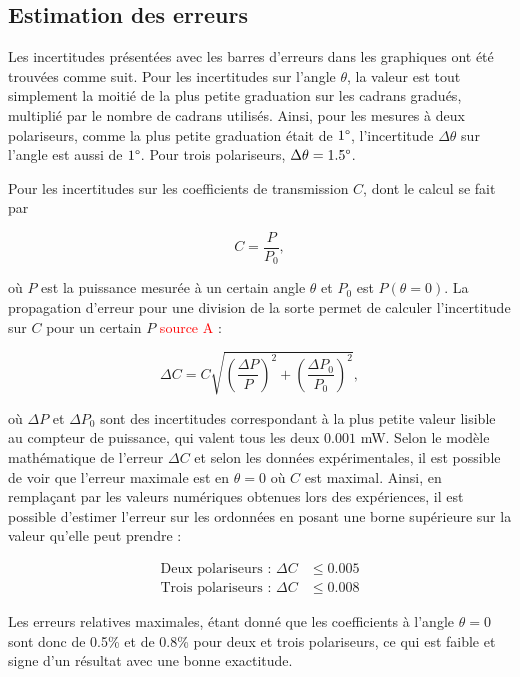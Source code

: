\documentclass[11pt,letterpaper]{article}
\begin{document}
\subsection{Estimation des erreurs}

Les incertitudes présentées avec les barres d'erreurs dans les graphiques ont été trouvées comme suit.
Pour les incertitudes sur l'angle $\theta$, la valeur est tout simplement la moitié de la plus petite
graduation sur les cadrans gradués, multiplié par le nombre de cadrans utilisés. Ainsi, pour les
mesures à deux polariseurs, comme la plus petite graduation était de $1\degree$, l'incertitude 
$\Delta\theta$  sur l'angle est aussi de $1\degree$. Pour trois polariseurs, $\Delta\theta = 1.5\degree$. 

Pour les incertitudes sur les coefficients de transmission $C$, dont le calcul se fait par

\begin{equation}
  C = \frac{P}{P_{0}},
\end{equation}

où $P$ est la puissance mesurée à un certain angle $\theta$ et $P_{0}$ est $P\left( \theta= 0 \right)$.
La propagation d'erreur pour une division de la sorte permet de calculer l'incertitude sur $C$ pour un
certain $P$ \textcolor{red}{source A} :

\begin{equation}
  \Delta C = C\sqrt{\left( \frac{\Delta P}{P} \right)^{2} + \left( \frac{\Delta P_{0}}{P_{0}} \right)^{2}},
\end{equation}

où $\Delta P$ et $\Delta P_{0}$ sont des incertitudes correspondant à la plus petite valeur lisible au
compteur de puissance, qui valent tous les deux $0.001$ mW. Selon le modèle mathématique de 
l'erreur $\Delta C$ et selon les données expérimentales, il est possible de voir que l'erreur maximale 
est en $\theta= 0$ où $C$ est maximal. Ainsi, en remplaçant par les valeurs numériques obtenues lors 
des expériences, il est possible d'estimer l'erreur sur les ordonnées en posant une borne supérieure 
sur la valeur qu'elle peut prendre :

\begin{align*}
  \text{Deux polariseurs : }\Delta C &\leq 0.005\\ 
  \text{Trois polariseurs : }\Delta C &\leq 0.008
\end{align*}

Les erreurs relatives maximales, étant donné que les coefficients à l'angle $\theta= 0$ sont donc de 
0.5\% et de 0.8\% pour deux et trois polariseurs, ce qui est faible et signe d'un résultat avec une
bonne exactitude.
\end{document}
